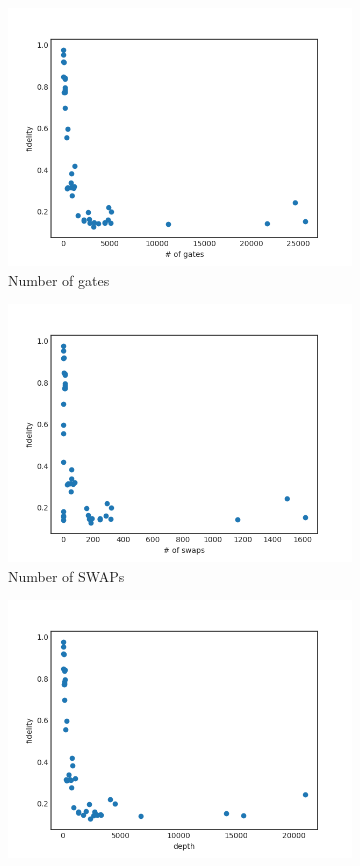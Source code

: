 \documentclass[11pt]{article}
\begin{document}
\begin{figure}[H] 
  \begin{subfigure}[b]{0.5\linewidth}
    \centering
    \includegraphics[width=0.75\linewidth]{f_g_1000} 
    \caption{Number of gates} 
    \label{fig:f_g_1000} 
    \vspace{4ex}
  \end{subfigure}%
  \begin{subfigure}[b]{0.5\linewidth}
    \centering
    \includegraphics[width=0.75\linewidth]{f_s_1000} 
    \caption{Number of SWAPs} 
    \label{fig:f_s_1000} 
    \vspace{4ex}
  \end{subfigure} 
  \begin{subfigure}[b]{0.5\linewidth}
    \centering
    \includegraphics[width=0.75\linewidth]{f_d_1000} 

\end{subfigure}
\end{figure}
\end{document}
